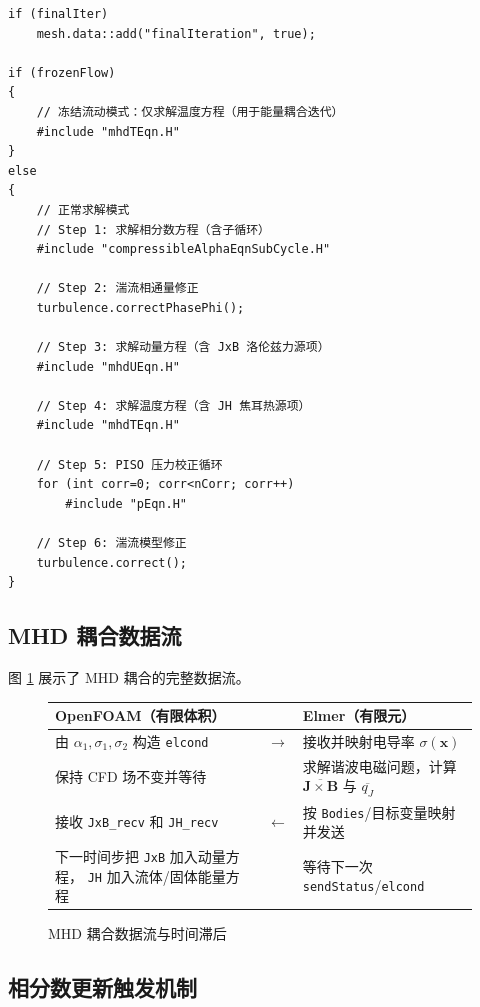 \documentclass[11pt,a4paper]{article}
\begin{document}
\begin{lstlisting}[style=cppstyle, caption={solveMhdFluid.H 流体区求解流程}]
if (finalIter)
    mesh.data::add("finalIteration", true);

if (frozenFlow)
{
    // 冻结流动模式：仅求解温度方程（用于能量耦合迭代）
    #include "mhdTEqn.H"
}
else
{
    // 正常求解模式
    // Step 1: 求解相分数方程（含子循环）
    #include "compressibleAlphaEqnSubCycle.H"
    
    // Step 2: 湍流相通量修正
    turbulence.correctPhasePhi();
    
    // Step 3: 求解动量方程（含 JxB 洛伦兹力源项）
    #include "mhdUEqn.H"
    
    // Step 4: 求解温度方程（含 JH 焦耳热源项）
    #include "mhdTEqn.H"
    
    // Step 5: PISO 压力校正循环
    for (int corr=0; corr<nCorr; corr++)
        #include "pEqn.H"
    
    // Step 6: 湍流模型修正
    turbulence.correct();
}
\end{lstlisting}

\subsection{MHD 耦合数据流}

图 \ref{fig:mhd_flow} 展示了 MHD 耦合的完整数据流。

\begin{figure}[H]
\centering
\begin{tabularx}{0.96\textwidth}{L{0.40\textwidth}cL{0.40\textwidth}}
\toprule
\textbf{OpenFOAM（有限体积）} & & \textbf{Elmer（有限元）}\\
\midrule
由 $\alpha_1,\sigma_1,\sigma_2$ 构造 \texttt{elcond}
& $\longrightarrow$ & 接收并映射电导率 $\sigma(\mathbf{x})$\\
保持 CFD 场不变并等待 &
& 求解谐波电磁问题，计算 $\overline{\mathbf J\times\mathbf B}$
与 $\overline{q_J}$\\
接收 \texttt{JxB\_recv} 和 \texttt{JH\_recv}
& $\longleftarrow$ & 按 \texttt{Bodies}/目标变量映射并发送\\
下一时间步把 \texttt{JxB} 加入动量方程，
\texttt{JH} 加入流体/固体能量方程 &
& 等待下一次 \texttt{sendStatus}/\texttt{elcond}\\
\bottomrule
\end{tabularx}
\caption{MHD 耦合数据流与时间滞后}
\label{fig:mhd_flow}
\end{figure}

\subsection{相分数更新触发机制}
\end{document}
